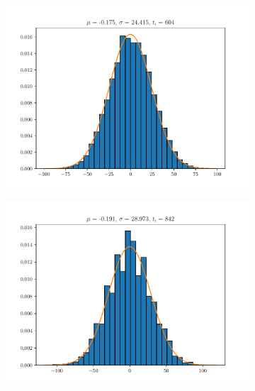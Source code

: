 \documentclass{article}
\begin{document}
\begin{figure}
\begin{subfigure}{.3\textwidth}
\end{subfigure}
\newline

\begin{subfigure}{.3\textwidth}
  \centering
  \includegraphics[width=1.1\linewidth]{hist7.pdf}
\end{subfigure}
\begin{subfigure}{.3\textwidth}
  \centering
  \includegraphics[width=1.1\linewidth]{hist8.pdf}
\end{subfigure}
\begin{subfigure}{.3\textwidth}
  \centering

\end{subfigure}
\end{figure}
\end{document}
